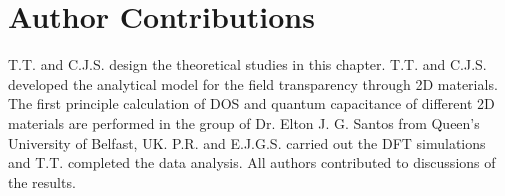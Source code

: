 \section{Author Contributions}
\label{sec:qc-author-contributions}
T.T. and C.J.S. design the theoretical studies in this
chapter. T.T. and C.J.S. developed the analytical model for the field
transparency through 2D materials. The first principle calculation of
DOS and quantum capacitance of different 2D materials are performed in
the group of Dr. Elton J. G. Santos from Queen's University of
Belfast, UK. P.R. and E.J.G.S. carried out the DFT simulations and
T.T. completed the data analysis. All authors contributed to
discussions of the results.


